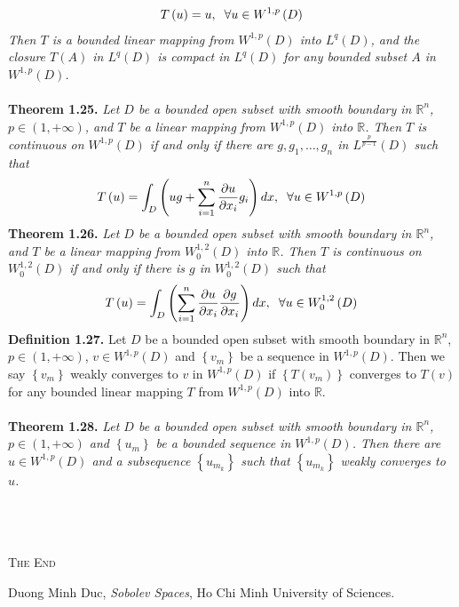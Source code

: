 \documentclass[a4paper]{article}
\numberwithin{equation}{section}
\begin{document}
\begin{align}
T\left( u \right) = u,\hspace{0.2cm}\forall u \in {W^{1,p}}\left( D \right)
\end{align}
\textit{Then $T$ is a bounded linear mapping from $W^{1,p}\left(D\right)$ into $L^q\left(D\right)$, and the closure $T\left(A\right)$ in $L^q\left(D\right)$ is compact in $L^q\left(D\right)$ for any bounded subset $A$ in $W^{1,p}\left(D\right)$.}\\
\\
\textbf{Theorem 1.25.} \textit{Let $D$ be a bounded open subset with smooth boundary in $\mathbb{R}^n$, $p\in \left(1,+\infty\right)$, and $T$ be a linear mapping from $W^{1,p}\left(D\right)$ into $\mathbb{R}$. Then $T$ is continuous on $W^{1,p}\left(D\right)$ if and only if there are $g,g_1,\ldots,g_n$ in ${L^{\frac{p}{{p - 1}}}}\left( D \right)$ such that}
\begin{align}
T\left( u \right) = \int_D {\left( {ug + \sum\limits_{i = 1}^n {\frac{{\partial u}}{{\partial {x_i}}}{g_i}} } \right)dx} ,\hspace{0.2cm}\forall u \in {W^{1,p}}\left( D \right)
\end{align}
\textbf{Theorem 1.26.} \textit{Let $D$ be a bounded open subset with smooth boundary in $\mathbb{R}^n$, and $T$ be a linear mapping from $W_0^{1,2}\left(D\right)$ into $\mathbb{R}$. Then $T$ is continuous on $W_0^{1,2}\left(D\right)$ if and only if there is $g$ in $W_0^{1,2}\left(D\right)$ such that}
\begin{align}
T\left( u \right) = \int_D {\left( {\sum\limits_{i = 1}^n {\frac{{\partial u}}{{\partial {x_i}}}\frac{{\partial g}}{{\partial {x_i}}}} } \right)dx} ,\hspace{0.2cm}\forall u \in W_0^{1,2}\left( D \right)
\end{align}
\textbf{Definition 1.27.} Let $D$ be a bounded open subset with smooth boundary in $\mathbb{R}^n$, $p\in \left(1,+\infty\right)$, $v \in W^{1,p}\left(D\right)$ and $\left\{v_m\right\}$ be a sequence in $W^{1,p}\left(D\right)$. Then we say $\left\{v_m\right\}$ weakly converges to $v$ in $W^{1,p}\left(D\right)$ if $\left\{ {T\left( {{v_m}} \right)} \right\}$ converges to $T\left(v\right)$ for any bounded linear mapping $T$ from $W^{1,p}\left(D\right)$ into $\mathbb{R}$.\\
\\
\textbf{Theorem 1.28.} \textit{Let $D$ be a bounded open subset with smooth boundary in $\mathbb{R}^n$, $p\in \left(1,+\infty\right)$ and $\left\{u_m\right\}$ be a bounded sequence in $W^{1,p}\left(D\right)$. Then there are $u \in W^{1,p}\left(D\right)$ and a subsequence $\left\{u_{m_k}\right\}$ such that $\left\{u_{m_k}\right\}$ weakly converges to $u$.}\\
\\
\\
\\
\begin{center}
\textsc{The End}
\end{center}

\newpage
\printindex
\newpage
\begin{thebibliography}{999}
 Duong Minh Duc, \textit{Sobolev Spaces}, Ho Chi Minh University of Sciences.
\end{thebibliography}
\end{document}

